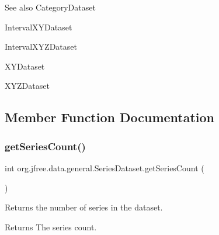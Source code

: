 \begin{DoxySeeAlso}{See also}
Category\+Dataset 

Interval\+X\+Y\+Dataset 

Interval\+X\+Y\+Z\+Dataset 

X\+Y\+Dataset 

X\+Y\+Z\+Dataset 
\end{DoxySeeAlso}


\subsection{Member Function Documentation}
\mbox{\label{interfaceorg_1_1jfree_1_1data_1_1general_1_1_series_dataset_a84fe822f5918f941d9de1ed1b73c9f58}} 
\subsubsection{\texorpdfstring{get\+Series\+Count()}{getSeriesCount()}}
{\footnotesize\ttfamily int org.\+jfree.\+data.\+general.\+Series\+Dataset.\+get\+Series\+Count (\begin{DoxyParamCaption}{ }\end{DoxyParamCaption})}

Returns the number of series in the dataset.

\begin{DoxyReturn}{Returns}
The series count. 
\end{DoxyReturn}


